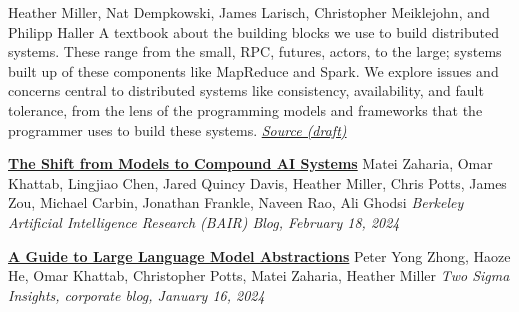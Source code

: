 \documentclass[9pt]{article}
\begin{document}



\bigskip
{}

\dates{}
\newline\noindent Heather Miller, Nat Dempkowski, James Larisch,
\newline\noindent Christopher Meiklejohn, and Philipp Haller
\smallskip
\newline\noindent A textbook about the building blocks we use to build distributed systems. These range from the small, RPC, futures, actors, to the large; systems built up of these components like MapReduce and Spark. We explore issues and concerns central to distributed systems like consistency, availability, and fault tolerance, from the lens of the programming models and frameworks that the programmer uses to build these systems.
\newline\noindent\href{https://github.com/heathermiller/dist-prog-book}{\em Source (draft)}
\bigskip


\bigskip

\noindent\href{https://bair.berkeley.edu/blog/2024/02/18/compound-ai-systems/}{\bf The Shift from Models to Compound AI Systems}
\newline\noindent Matei Zaharia, Omar Khattab, Lingjiao Chen, Jared Quincy Davis,\vspace{-0.03in}  \newline\noindent Heather Miller, Chris Potts, James Zou, Michael Carbin,\vspace{-0.03in}
\newline\noindent Jonathan Frankle, Naveen Rao, Ali Ghodsi
\newline\noindent\emph{Berkeley Artificial Intelligence Research (BAIR) Blog, February 18, 2024}
\bigskip

\noindent\href{https://www.twosigma.com/articles/a-guide-to-large-language-model-abstractions/}{\bf A Guide to Large Language Model Abstractions}
\newline\noindent Peter Yong Zhong, Haoze He, Omar Khattab, Christopher Potts,\vspace{-0.03in}
\newline\noindent Matei Zaharia, Heather Miller
\newline\noindent\emph{Two Sigma Insights, corporate blog, January 16, 2024}
\bigskip
\end{document}
